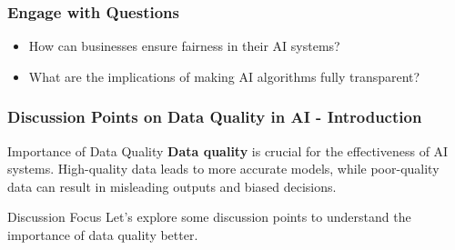 \documentclass[aspectratio=169]{beamer}
\begin{document}
\begin{frame}[fragile]
    \frametitle{Engage with Questions}
    \begin{itemize}
        \item How can businesses ensure fairness in their AI systems?
        \item What are the implications of making AI algorithms fully transparent?
    \end{itemize}
\end{frame}

\begin{frame}[fragile]
    \frametitle{Discussion Points on Data Quality in AI - Introduction}
    \begin{block}{Importance of Data Quality}
        \textbf{Data quality} is crucial for the effectiveness of AI systems. High-quality data leads to more accurate models, while poor-quality data can result in misleading outputs and biased decisions.
    \end{block}
    
    \begin{block}{Discussion Focus}
        Let’s explore some discussion points to understand the importance of data quality better.
    \end{block}    
\end{frame}
\end{document}
